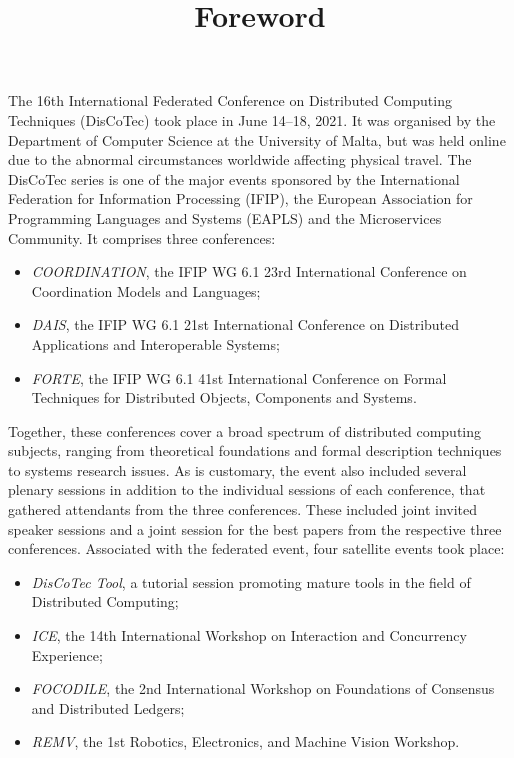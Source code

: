 \documentclass[10pt]{article}
\title{Foreword}
\date{}
\begin{document}
\maketitle
\thispagestyle{empty}



The 16th International Federated Conference on Distributed Computing Techniques (DisCoTec) took place in June 14–18, 2021. 
%
It was organised by the Department of Computer Science at the University of Malta, but was held online due to the abnormal circumstances worldwide affecting physical travel.
%
The DisCoTec series is one of the major events sponsored by the International Federation for Information Processing (IFIP), the European Association for Programming Languages and Systems (EAPLS) and the Microservices Community. It comprises three conferences:
\begin{itemize}
  \item \emph{COORDINATION}, the IFIP WG 6.1 23rd International Conference on Coordination Models and Languages;
  \item \emph{DAIS}, the IFIP WG 6.1 21st International Conference on Distributed Applications and Interoperable Systems;
  \item \emph{FORTE}, the IFIP WG 6.1 41st International Conference on Formal Techniques for Distributed Objects, Components and Systems.
\end{itemize}

Together, these conferences cover a broad spectrum of distributed computing subjects, ranging from theoretical foundations and formal description techniques to systems research issues. 
%
As is customary, the event also included several plenary sessions in addition to the individual sessions of each conference, that gathered attendants from the three conferences.  
%
These included joint invited speaker sessions and a joint session for the best papers from the respective three conferences. 
%
Associated with the federated event, four satellite events took place:
\begin{itemize}
  \item \emph{DisCoTec Tool}, a tutorial session promoting mature tools in the field of Distributed Computing;
  \item  \emph{ICE}, the 14th International Workshop on Interaction and Concurrency Experience; 
  \item \emph{FOCODILE}, the 2nd International Workshop on Foundations of Consensus and Distributed Ledgers;
  \item \emph{REMV}, the 1st Robotics, Electronics, and Machine Vision Workshop. 
\end{itemize}
\end{document}
